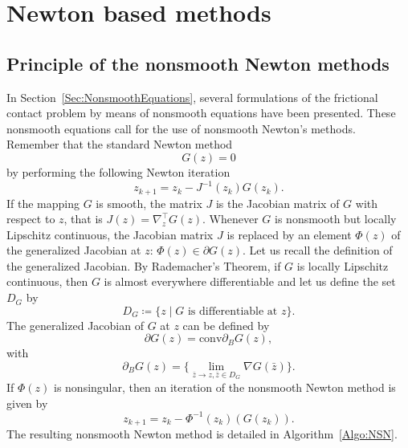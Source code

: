 {\section{Newton based methods}
\label{sec:newtonmethods}


\subsection{Principle of the nonsmooth Newton methods}

In Section~\ref{Sec:NonsmoothEquations}, several formulations of the frictional contact problem by means of nonsmooth equations  have been presented. These nonsmooth equations call for the use of nonsmooth Newton's methods. Remember that the standard Newton method 
\begin{equation}
  \label{eq:NSN1}
  G(z)=0
\end{equation}
by performing the following Newton iteration
\begin{equation}
  \label{eq:NSN2}
  z_{k+1}  =  z_k -  J^{-1}(z_k) G(z_k).
\end{equation}
If the mapping $G$ is smooth, the matrix $J$ is the Jacobian matrix of $G$ with respect to $z$, that is $J(z) = \nabla^\top_z G(z)$.
Whenever $G$ is nonsmooth but locally Lipschitz continuous,  the Jacobian matrix $J$ is replaced by an element $\Phi(z)$ of the generalized Jacobian at $z$: $\Phi(z) \in \partial G(z)$. Let us recall the definition of the generalized Jacobian. By Rademacher's Theorem, if $G$ is locally Lipschitz continuous, then $G$ is almost everywhere differentiable and let us define the set $D_G$ by
\begin{equation}
  \label{eq:NSN4}
  D_G \coloneqq \{z \mid G \text{ is differentiable at } z\}.
\end{equation}
The generalized Jacobian of $G$ at $z$ can be defined by
\begin{equation}
  \label{eq:NSN5}
  \partial G(z) = \mbox{conv} \partial_B G(z),
\end{equation}
with
\begin{equation}
  \label{eq:NSN6}
   \partial_B G(z) = \{\lim_{\bar z \rightarrow z, \bar z\in D_G} \nabla G(\bar z)\}.
 \end{equation}
If $\Phi(z)$ is nonsingular, then an iteration of the nonsmooth Newton method is given by
\begin{equation}
  \label{eq:NSN3}
  z_{k+1}  =  z_k -  \Phi^{-1}(z_k) (G(z_k)).
\end{equation}
The resulting nonsmooth Newton method is detailed in Algorithm~\ref{Algo:NSN}.
}
